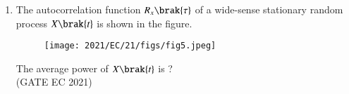 \begin{enumerate}[label=\thechapter.\arabic*,ref=\thechapter.\theenumi]
\item The autocorrelation function $R_x \brak{\tau}$ of a wide-sense stationary random process $X \brak{t}$ is shown in the figure.
\begin{figure}[ht]
    \centering
    \texttt{[image: 2021/EC/21/figs/fig5.jpeg]}
    \label{fig: 10.5.3.129393}
\end{figure}
The average power of $ X \brak{t}$ is ?\\
\hfill(GATE EC 2021)
\solution

\pagebreak
\end{enumerate}
